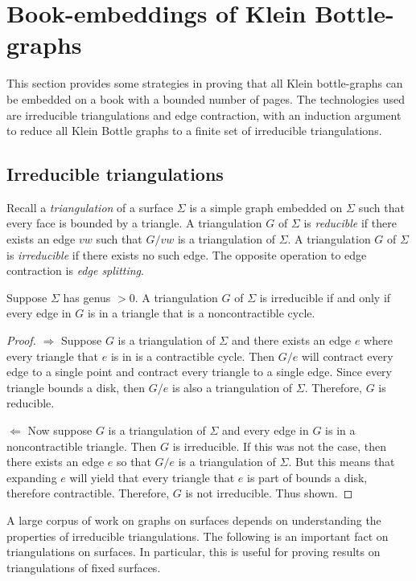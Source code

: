 \section{Book-embeddings of Klein Bottle-graphs}
This section provides some strategies in proving that all Klein bottle-graphs can be embedded on a book with a bounded number of pages. The technologies used are irreducible triangulations and edge contraction, with an induction argument to reduce all Klein Bottle graphs to a finite set of irreducible triangulations.

\subsection{Irreducible triangulations}
Recall a \textit{triangulation} of a surface $\Sigma$ is a simple graph embedded on $\Sigma$ such that every face is bounded by a triangle. A triangulation $G$ of $\Sigma$ is \textit{reducible} if there exists an edge $vw$ such that $G / vw$ is a triangulation of $\Sigma$. A triangulation $G$ of $\Sigma$ is \textit{irreducible} if there exists no such edge. The opposite operation to edge contraction is \textit{edge splitting}. 

\begin{proposition}
    Suppose $\Sigma$ has genus $> 0$. A triangulation $G$ of $\Sigma$ is irreducible if and only if every edge in $G$ is in a triangle that is a noncontractible cycle.
\end{proposition}

\begin{proof}
    $\Rightarrow$ Suppose $G$ is a triangulation of $\Sigma$ and there exists an edge $e$ where every triangle that $e$ is in is a contractible cycle. Then $G/ e$ will contract every edge to a single point and contract every triangle to a single edge. Since every triangle bounds a disk, then $G / e$ is also a triangulation of $\Sigma$. Therefore, $G$ is reducible. 

    $\Leftarrow$ Now suppose $G$ is a triangulation of $\Sigma$ and every edge in $G$ is in a noncontractible triangle. Then $G$ is irreducible. If this was not the case, then there exists an edge $e$ so that $G / e$ is a triangulation of $\Sigma$. But this means that expanding $e$ will yield that every triangle that $e$ is part of bounds a disk, therefore contractible. Therefore, $G$ is not irreducible. Thus shown. 
\end{proof}

A large corpus of work on graphs on surfaces depends on understanding the properties of irreducible triangulations. The following is an important fact on triangulations on surfaces. In particular, this is useful for proving results on triangulations of fixed surfaces. 

